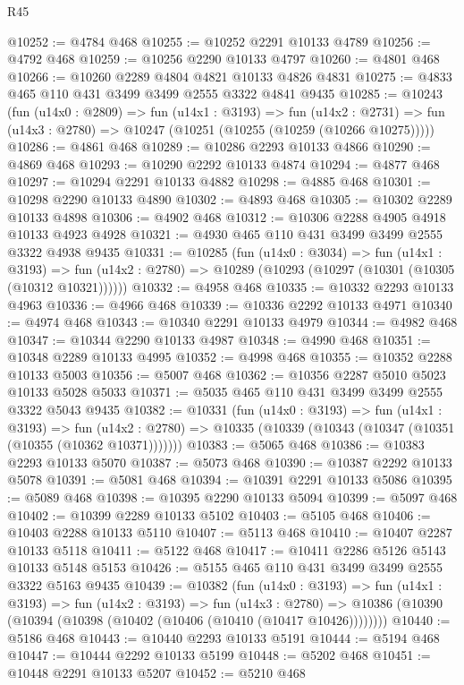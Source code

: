 \begin{lexlean}{R45}
\begin{coremodule}
@10252 := @4784 @468
@10255 := @10252 @2291 @10133 @4789
@10256 := @4792 @468
@10259 := @10256 @2290 @10133 @4797
@10260 := @4801 @468
@10266 := @10260 @2289 @4804 @4821 @10133 @4826 @4831
@10275 := @4833 @465 @110 @431 @3499 @3499 @2555 @3322 @4841 @9435
@10285 := @10243
    (fun (u14x0 : @2809) =>
    fun (u14x1 : @3193) =>
    fun (u14x2 : @2731) => fun (u14x3 : @2780) => @10247 (@10251 (@10255 (@10259 (@10266 @10275)))))
@10286 := @4861 @468
@10289 := @10286 @2293 @10133 @4866
@10290 := @4869 @468
@10293 := @10290 @2292 @10133 @4874
@10294 := @4877 @468
@10297 := @10294 @2291 @10133 @4882
@10298 := @4885 @468
@10301 := @10298 @2290 @10133 @4890
@10302 := @4893 @468
@10305 := @10302 @2289 @10133 @4898
@10306 := @4902 @468
@10312 := @10306 @2288 @4905 @4918 @10133 @4923 @4928
@10321 := @4930 @465 @110 @431 @3499 @3499 @2555 @3322 @4938 @9435
@10331 := @10285
    (fun (u14x0 : @3034) =>
    fun (u14x1 : @3193) =>
    fun (u14x2 : @2780) => @10289 (@10293 (@10297 (@10301 (@10305 (@10312 @10321))))))
@10332 := @4958 @468
@10335 := @10332 @2293 @10133 @4963
@10336 := @4966 @468
@10339 := @10336 @2292 @10133 @4971
@10340 := @4974 @468
@10343 := @10340 @2291 @10133 @4979
@10344 := @4982 @468
@10347 := @10344 @2290 @10133 @4987
@10348 := @4990 @468
@10351 := @10348 @2289 @10133 @4995
@10352 := @4998 @468
@10355 := @10352 @2288 @10133 @5003
@10356 := @5007 @468
@10362 := @10356 @2287 @5010 @5023 @10133 @5028 @5033
@10371 := @5035 @465 @110 @431 @3499 @3499 @2555 @3322 @5043 @9435
@10382 := @10331
    (fun (u14x0 : @3193) =>
    fun (u14x1 : @3193) =>
    fun (u14x2 : @2780) => @10335 (@10339 (@10343 (@10347 (@10351 (@10355 (@10362 @10371)))))))
@10383 := @5065 @468
@10386 := @10383 @2293 @10133 @5070
@10387 := @5073 @468
@10390 := @10387 @2292 @10133 @5078
@10391 := @5081 @468
@10394 := @10391 @2291 @10133 @5086
@10395 := @5089 @468
@10398 := @10395 @2290 @10133 @5094
@10399 := @5097 @468
@10402 := @10399 @2289 @10133 @5102
@10403 := @5105 @468
@10406 := @10403 @2288 @10133 @5110
@10407 := @5113 @468
@10410 := @10407 @2287 @10133 @5118
@10411 := @5122 @468
@10417 := @10411 @2286 @5126 @5143 @10133 @5148 @5153
@10426 := @5155 @465 @110 @431 @3499 @3499 @2555 @3322 @5163 @9435
@10439 := @10382
    (fun (u14x0 : @3193) =>
    fun (u14x1 : @3193) =>
    fun (u14x2 : @3193) =>
    fun (u14x3 : @2780) =>
    @10386 (@10390 (@10394 (@10398 (@10402 (@10406 (@10410 (@10417 @10426))))))))
@10440 := @5186 @468
@10443 := @10440 @2293 @10133 @5191
@10444 := @5194 @468
@10447 := @10444 @2292 @10133 @5199
@10448 := @5202 @468
@10451 := @10448 @2291 @10133 @5207
@10452 := @5210 @468

\end{coremodule}
\end{lexlean}
